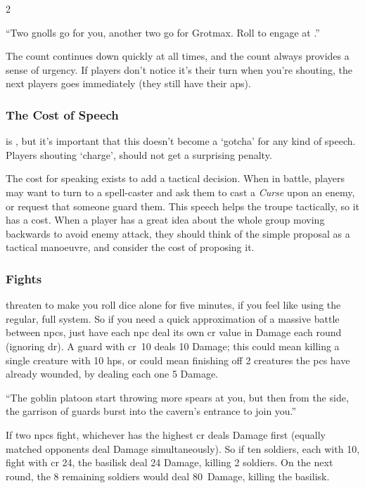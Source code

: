 \begin{multicols}{2}
\begin{speechtext}
  ``Two gnolls go for you, another two go for Grotmax.
  Roll to engage at \tn[11].''

\end{speechtext}

The count continues down quickly at all times, and the count always provides a sense of urgency.
If players don't notice it's their turn when you're shouting, the next players goes immediately (they still have their \glspl{ap}).

\subsubsection{The Cost of Speech}
is , but it's important that this doesn't become a `gotcha' for any kind of speech.
Players shouting `charge', should not get a surprising penalty.

The cost for speaking exists to add a tactical decision.
When in battle, players may want to turn to a spell-caster and ask them to cast a \textit{Curse} upon an enemy, or request that someone guard them.
This speech helps the troupe tactically, so it has a cost.
When a player has a great idea about the whole group moving backwards to avoid enemy attack, they should think of the simple proposal as a tactical manoeuvre, and consider the cost of proposing it.

\subsubsection{ Fights}
\label{npcfights}
threaten to make you roll dice alone for five minutes, if you feel like using the regular, full system.
So if you need a quick approximation of a massive battle between \glspl{npc}, just have each \gls{npc} deal its own \gls{cr} value in Damage each round (ignoring \gls{dr}).
A guard with \gls{cr}~10 deals 10 Damage; this could mean killing a single creature with 10 \glspl{hp}, or could mean finishing off 2 creatures the \glspl{pc} have already wounded, by dealing each one 5 Damage.

\begin{exampletext}
  ``The goblin platoon start throwing more spears at you, but then from the side, the garrison of guards burst into the cavern's entrance to join you.''
\end{exampletext}

If two \glspl{npc} fight, whichever has the highest \gls{cr} deals Damage first (equally matched opponents deal Damage simultaneously).
So if ten soldiers, each with  10, fight  with \gls{cr} 24, the \gls{basilisk} deal 24 Damage, killing 2 soldiers.
On the next \gls{round}, the 8 remaining soldiers would deal 80~Damage, killing the \gls{basilisk}.


\end{multicols}

